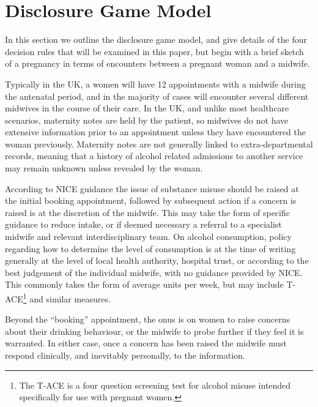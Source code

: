 \section{Disclosure Game Model}
\label{sec:model}

In this section we outline the disclosure game model, and give details of the four decision rules that will be examined in this paper, but begin with a brief sketch of a pregnancy in terms of encounters between a pregnant woman and a midwife. 

Typically in the UK, a women will have 12 appointments with a midwife during the antenatal period, and in the majority of cases will encounter several different midwives \citep{Redshaw2014} in the course of their care. In the UK, and unlike most healthcare scenarios, maternity notes are held by the patient, so midwives do not have extensive information prior to an appointment unless they have encountered the woman previously. Maternity notes are not generally linked to extra-departmental records, meaning that a history of alcohol related admissions to another service may remain unknown unless revealed by the woman.

According to NICE guidance \citep{NICE2010a,NICE2010} the issue of substance misuse should be raised at the initial booking appointment, followed by subsequent action if a concern is raised is at the discretion of the midwife. This may take the form of specific guidance to reduce intake, or if deemed necessary a referral to a specialist midwife and relevant interdisciplinary team. On alcohol consumption, policy regarding how to determine the level of consumption is at the time of writing generally at the level of local health authority, hospital trust, or according to the best judgement of the individual midwife, with no guidance provided by NICE. This commonly takes the form of average units per week, but may include \ac{T-ACE}\footnote{The \ac{T-ACE} is a four question screening test for alcohol misuse intended specifically for use with pregnant women.} \citep{Sokol1989863} and similar measures. 

Beyond the \enquote{booking} appointment, the onus is on women to raise concerns about their drinking behaviour, or the midwife to probe further if they feel it is warranted. In either case, once a concern has been raised the midwife must respond clinically, and inevitably personally, to the information.

